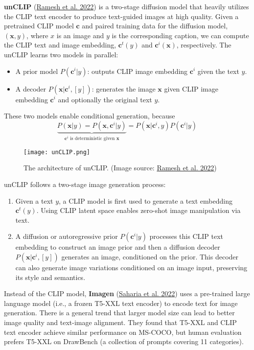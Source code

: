\documentclass[12pt]{article}
\begin{document}
\textbf{unCLIP} (\href{https://arxiv.org/abs/2204.06125}{Ramesh et al. 2022}) is a two-stage diffusion model that heavily utilizes the CLIP text encoder to produce text-guided images at high quality. Given a pretrained CLIP model $\mathbf{c}$ and paired training data for the diffusion model, $(\mathbf{x}, y)$, where $x$ is an image and $y$ is the corresponding caption, we can compute the CLIP text and image embedding, $\mathbf{c}^t(y)$ and $\mathbf{c}^i(\mathbf{x})$, respectively. The unCLIP learns two models in parallel:
\begin{itemize}
    \item A prior model $P(\mathbf{c}^i \vert y)$: outputs CLIP image embedding $\mathbf{c}^i$ given the text $y$.
    \item A decoder $P(\mathbf{x} \vert \mathbf{c}^i, [y])$: generates the image $\mathbf{x}$ given CLIP image embedding $\mathbf{c}^i$ and optionally the original text $y$.
\end{itemize}

These two models enable conditional generation, because
\[
\underbrace{P(\mathbf{x} \vert y) = P(\mathbf{x}, \mathbf{c}^i \vert y)}_{\mathbf{c}^i\text{ is deterministic given }\mathbf{x}} = P(\mathbf{x} \vert \mathbf{c}^i, y)P(\mathbf{c}^i \vert y)
\]
\begin{figure}[H]
    \centering
    \texttt{[image: unCLIP.png]}
    \caption{The architecture of unCLIP. (Image source: \href{https://arxiv.org/abs/2204.06125}{Ramesh et al. 2022})}
\end{figure}

unCLIP follows a two-stage image generation process:
\begin{enumerate}
    \item Given a text $y$, a CLIP model is first used to generate a text embedding $\mathbf{c}^t(y)$. Using CLIP latent space enables zero-shot image manipulation via text.
    \item A diffusion or autoregressive prior $P(\mathbf{c}^i \vert y)$ processes this CLIP text embedding to construct an image prior and then a diffusion decoder $P(\mathbf{x} \vert \mathbf{c}^i, [y])$ generates an image, conditioned on the prior. This decoder can also generate image variations conditioned on an image input, preserving its style and semantics.
\end{enumerate}

Instead of the CLIP model, \textbf{Imagen} (\href{https://arxiv.org/abs/2205.11487}{Saharia et al. 2022}) uses a pre-trained large language model (i.e., a frozen T5-XXL text encoder) to encode text for image generation. There is a general trend that larger model size can lead to better image quality and text-image alignment. They found that T5-XXL and CLIP text encoder achieve similar performance on MS-COCO, but human evaluation prefers T5-XXL on DrawBench (a collection of prompts covering 11 categories).
\end{document}
